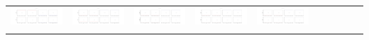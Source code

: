 \documentclass[]{article}
\begin{document}
\begin{table}[h]
\begin{tabular}{| c | c | c | c | c | c | c | c | c | c |}
		\includegraphics[width=0.09\linewidth]{0.90_0.50.png} &
		\includegraphics[width=0.09\linewidth]{0.90_0.60.png} &
		\includegraphics[width=0.09\linewidth]{0.90_0.70.png} &
		\includegraphics[width=0.09\linewidth]{0.90_0.80.png} &
		\includegraphics[width=0.09\linewidth]{0.90_0.90.png} \\
		& & & & & & & & & \\
		\hline
	\end{tabular}
\end{table}
\end{document}
